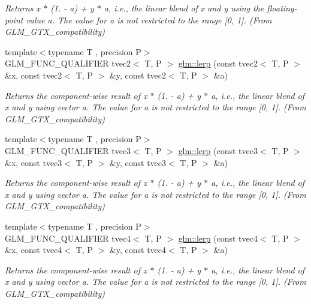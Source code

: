\begin{DoxyCompactItemize}
\begin{DoxyCompactList}\small\item\em Returns x $\ast$ (1. -\/ a) + y $\ast$ a, i.\+e., the linear blend of x and y using the floating-\/point value a. The value for a is not restricted to the range \mbox{[}0, 1\mbox{]}. (From G\+L\+M\+\_\+\+G\+T\+X\+\_\+compatibility) \end{DoxyCompactList}\item 
{\footnotesize template$<$typename T , precision P$>$ }\\G\+L\+M\+\_\+\+F\+U\+N\+C\+\_\+\+Q\+U\+A\+L\+I\+F\+I\+E\+R tvec2$<$ T, P $>$ \hyperlink{group__gtx__compatibility_ga7609b44d8aefc5a277efe73395ff4070}{glm\+::lerp} (const tvec2$<$ T, P $>$ \&x, const tvec2$<$ T, P $>$ \&y, const tvec2$<$ T, P $>$ \&a)
\begin{DoxyCompactList}\small\item\em Returns the component-\/wise result of x $\ast$ (1. -\/ a) + y $\ast$ a, i.\+e., the linear blend of x and y using vector a. The value for a is not restricted to the range \mbox{[}0, 1\mbox{]}. (From G\+L\+M\+\_\+\+G\+T\+X\+\_\+compatibility) \end{DoxyCompactList}\item 
{\footnotesize template$<$typename T , precision P$>$ }\\G\+L\+M\+\_\+\+F\+U\+N\+C\+\_\+\+Q\+U\+A\+L\+I\+F\+I\+E\+R tvec3$<$ T, P $>$ \hyperlink{group__gtx__compatibility_ga90a1d1364a8d078846857178bdcc9af1}{glm\+::lerp} (const tvec3$<$ T, P $>$ \&x, const tvec3$<$ T, P $>$ \&y, const tvec3$<$ T, P $>$ \&a)
\begin{DoxyCompactList}\small\item\em Returns the component-\/wise result of x $\ast$ (1. -\/ a) + y $\ast$ a, i.\+e., the linear blend of x and y using vector a. The value for a is not restricted to the range \mbox{[}0, 1\mbox{]}. (From G\+L\+M\+\_\+\+G\+T\+X\+\_\+compatibility) \end{DoxyCompactList}\item 
{\footnotesize template$<$typename T , precision P$>$ }\\G\+L\+M\+\_\+\+F\+U\+N\+C\+\_\+\+Q\+U\+A\+L\+I\+F\+I\+E\+R tvec4$<$ T, P $>$ \hyperlink{group__gtx__compatibility_gae4b0244b0d882657bed0a99dfa33f379}{glm\+::lerp} (const tvec4$<$ T, P $>$ \&x, const tvec4$<$ T, P $>$ \&y, const tvec4$<$ T, P $>$ \&a)
\begin{DoxyCompactList}\small\item\em Returns the component-\/wise result of x $\ast$ (1. -\/ a) + y $\ast$ a, i.\+e., the linear blend of x and y using vector a. The value for a is not restricted to the range \mbox{[}0, 1\mbox{]}. (From G\+L\+M\+\_\+\+G\+T\+X\+\_\+compatibility) \end{DoxyCompactList}\item 

\end{DoxyCompactItemize}
